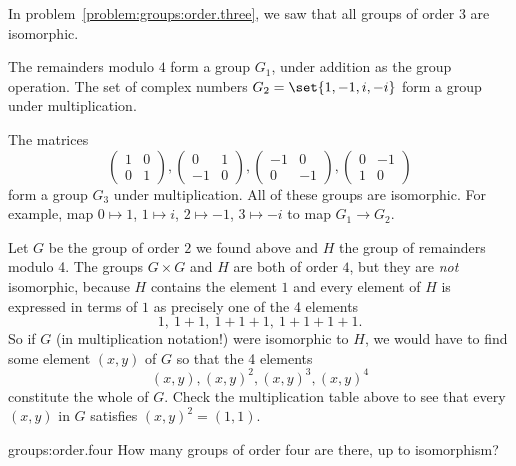 \begin{example}
In problem~\vref{problem:groups:order.three}, we saw that all groups of order 3 are isomorphic.
\end{example}
\begin{example}
The remainders modulo \(4\) form a group \(G_1\), under addition as the group operation.
The set of complex numbers \(G_2=\set{1,-1,i,-i}\) form a group under multiplication.
\end{example}
\begin{example}
The matrices
\[
\begin{pmatrix}
1 & 0 \\
0 & 1
\end{pmatrix},
\begin{pmatrix}
0 & 1 \\
-1 & 0
\end{pmatrix},
\begin{pmatrix}
-1 & 0 \\
0 & -1
\end{pmatrix},
\begin{pmatrix}
0 & -1 \\
1 & 0
\end{pmatrix}
\] 
form a group \(G_3\) under multiplication.
All of these groups are isomorphic.
For example, map \(0 \mapsto 1\), \(1 \mapsto i\), \(2 \mapsto -1\), \(3 \mapsto -i\) to map \(G_1 \to G_2\).
\end{example}
\begin{example}
Let \(G\) be the group of order \(2\) we found above and \(H\) the group of remainders modulo 4.
The groups \(G \times G\) and \(H\) are both of order \(4\), but they are \emph{not} isomorphic, because \(H\) contains the element \(1\) and every element of \(H\) is expressed in terms of \(1\) as precisely one of the 4 elements
\[
1,\ 1+1,\ 1+1+1,\ 1+1+1+1.
\]
So if \(G\) (in multiplication notation!) were isomorphic to \(H\), we would have to find some element \((x,y)\) of \(G\) so that the 4 elements 
\[
(x,y),(x,y)^2,(x,y)^3,(x,y)^4
\] 
constitute the whole of \(G\).
Check the multiplication table above to see that every \((x,y)\) in \(G\) satisfies \((x,y)^2=(1,1)\).
\end{example}
\begin{problem}{groups:order.four}
How many groups of order four are there, up to isomorphism?
\end{problem}
